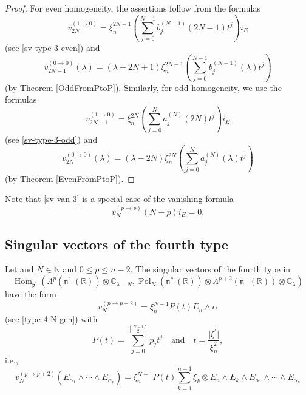 \documentclass[a4paper,12pt,reqno]{amsart}
\numberwithin{theorem}{subsection}
\numberwithin{equation}{section}
\begin{document}
\begin{proof} For even homogeneity, the assertions follow from the formulas
$$
   v_{2N}^{(1 \to 0)} = \xi_n^{2N-1} \left(\sum_{j=0}^{N-1} b_j^{(N-1)}(2N\!-\!1) t^j \right) i_E
$$
(see \eqref{sv-type-3-even}) and
$$
   v_{2N-1}^{(0 \to 0)}(\lambda) = (\lambda\!-\!2N\!+\!1) \xi_n^{2N-1}
   \left(\sum_{j=0}^{N-1} b_j^{(N-1)}(\lambda) t^j \right)
$$
(by Theorem \ref{OddFromPtoP}). Similarly, for odd homogeneity, we use the
formulas
$$
   v_{2N+1}^{(1 \to 0)} = \xi_n^{2N} \left(\sum_{j=0}^N a_j^{(N)}(2N) t^j\right) i_E
$$
(see \eqref{sv-type-3-odd}) and
$$
   v_{2N}^{(0 \to 0)}(\lambda) = (\lambda\!-\!2N) \xi_n^{2N}
   \left(\sum_{j=0}^{N} a_j^{(N)}(\lambda) t^j \right)
$$
(by Theorem \ref{EvenFromPtoP}).
\end{proof}

Note that \eqref{sv-van-3} is a special case of the vanishing formula
\begin{equation}\label{sv-van-1-gen}
   v_N^{(p \to p)}(N\!-\!p) i_E  = 0.
\end{equation}

\subsection{Singular vectors of the fourth type}\label{sv-type-4}

Let and $N \in {\mathbb{N}}$ and $0 \leq p \leq n-2$. The singular vectors of the fourth
type in
$$
   {\operatorname{Hom}}_{{{\mathfrak p}}^\prime}(\Lambda^p({{\mathfrak n}}_-^\prime({\mathbb{R}})) \otimes {\mathbb{C}}_{\lambda-N},
   {\operatorname{Pol}}_N({{\mathfrak n}}_-^*({\mathbb{R}})) \otimes \Lambda^{p+2}({{\mathfrak n}}_-({\mathbb{R}})) \otimes {\mathbb{C}}_\lambda)
$$
have the form
\begin{equation}\label{eq:HOM2}
   v^{(p\to p+2)}_N = \xi_n^{N-1} P(t) E_n \wedge \alpha
\end{equation}
(see \eqref{type-4-N-gen}) with
\begin{equation*}
   P(t)=\sum_{j=0}^{[\frac{N-1}{2}]}p_j t^j \quad \mbox{and} \quad t=
   \frac{{\lvert{\xi^\prime}\rvert}}{\xi_n^2},
\end{equation*}
i.e.,
\begin{equation*}
   v^{(p\to p+2)}_N (E_{\alpha_1}\wedge\cdots\wedge E_{\alpha_{p}})
   = \xi_n^{N-1} P(t) \sum_{k=1}^{n-1}\xi_{k}
   \otimes E_n \wedge E_k \wedge E_{\alpha_1}\wedge\cdots\wedge E_{\alpha_{p}}
\end{equation*}
\end{document}
